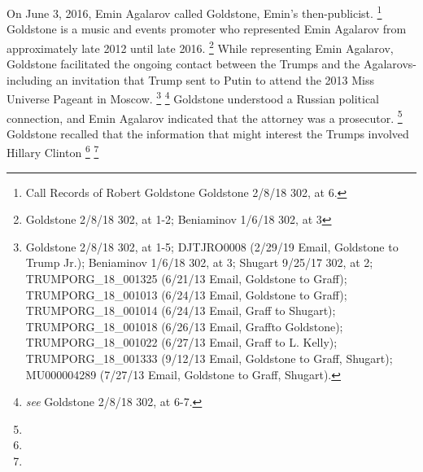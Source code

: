 On June 3, 2016, Emin Agalarov called Goldstone, Emin's then-publicist.%
\footnote{Call Records of Robert Goldstone  Goldstone 2/8/18 302, at 6.}
Goldstone is a music and events promoter who represented Emin Agalarov from approximately late 2012 until late 2016.%
\footnote{Goldstone 2/8/18 302, at 1-2;  Beniaminov 1/6/18 302, at 3}
While representing Emin Agalarov, Goldstone facilitated the ongoing contact between the Trumps and the Agalarovs-including an invitation that Trump sent to Putin to attend the 2013 Miss Universe Pageant in Moscow.%
\footnote{Goldstone 2/8/18 302, at 1-5; 
DJTJRO0008 (2/29/19 Email, Goldstone to Trump Jr.);
Beniaminov 1/6/18 302, at 3;
Shugart 9/25/17 302, at 2;
TRUMPORG\_18\_001325 (6/21/13 Email, Goldstone to Graff);
TRUMPORG\_18\_001013 (6/24/13 Email, Goldstone to Graff);
TRUMPORG\_18\_001014 (6/24/13 Email, Graff to Shugart);
TRUMPORG\_18\_001018 (6/26/13 Email, Graffto Goldstone);
TRUMPORG\_18\_001022 (6/27/13 Email, Graff to L. Kelly);
TRUMPORG\_18\_001333 (9/12/13 Email, Goldstone to Graff, Shugart);
MU000004289 (7/27/13 Email, Goldstone to Graff, Shugart).}
\footnote{ \textit{see} Goldstone 2/8/18 302, at 6-7.}
Goldstone understood
a Russian political connection, and Emin Agalarov indicated that the attorney was a prosecutor.%
\footnote{}
Goldstone recalled that the information that might interest the Trumps involved Hillary Clinton
\footnote{}
\footnote{}

